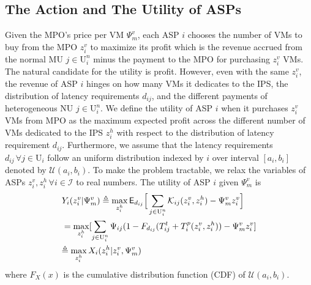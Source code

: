 \documentclass[10pt,journal, compsoc]{IEEEtran}
\begin{document}
\subsection{The Action and The Utility of ASPs}
Given the MPO's price per VM $\Psi_m^v$, each ASP $i$ chooses the number of VMs to buy from the MPO $z_i^v$ to maximize its profit which is the revenue accrued from the normal MU $j \in \mathrm{U}_i^n$ minus the payment to the MPO for purchasing $z_i^v$ VMs. The natural candidate for the utility is profit. However, even with the same $z_i^v$, the revenue of ASP $i$ hinges on how many VMs it dedicates to the IPS, the distribution of latency requirements $d_{ij}$, and the different payments of heterogeneous NU $j \in \mathrm{U}_i^n$. We define the utility of ASP $i$ when it purchases $z_i^v$ VMs from MPO as the maximum expected profit across the different number of VMs dedicated to the IPS $z_i^h$ with respect to the distribution of latency requirement $d_{ij}$. Furthermore, we assume that the latency requirements $d_{ij} \, \forall j \in \mathrm{U}_i$ follow an uniform distribution indexed by $i$ over interval $[a_i, b_i]$ denoted by $\mathcal{U}(a_i,b_i)$. To make the problem tractable, we relax the variables of ASPs $z_i^v, z_i^h \, \forall i \in \mathcal{I}$ to real numbers. The utility of ASP $i$ given $\Psi_m^v$ is
\begin{align}
&Y_i(z_i^v|\Psi_m^v) \triangleq \max_{z_i^h} \mathsf{E}_{d_{ij}}\Big[\sum_{j \in \mathrm{U}_i^n} \mathcal{K}_{ij}(z_i^v, z_i^h) - \Psi_m^v z_i^v\Big] 
\hspace*{-1mm}
\iffalse=\max_{z_i^h} \mathsf{E}_{d_{ij}}[\sum_{j \in \mathrm{U}_i^n}\Psi_{ij}\mathds{1}\{T_{ij}^t + T_i^p(z_i^v, z_i^h) \leq d_{ij}\} - \Psi_m^vz_i^v] \nonumber \fi\\
\hspace*{-1mm}&=\max_{z_i^h} [\sum_{j \in \mathrm{U}_i^n}\Psi_{ij}(1-F_{d_{ij}}(T_{ij}^t+T_i^p(z_i^v, z_i^h)) - \Psi_m^vz_i^v] \\ %
&\hspace*{-1mm}\triangleq \max_{z_i^h} X_i(z_i^h|z_i^v,\Psi_m^v) \label{eqn:asp_def_subobjective}
\end{align}
where $F_{X}(x)$ is the cumulative distribution function (CDF) of $\mathcal{U}(a_i,b_i)$.
\end{document}
